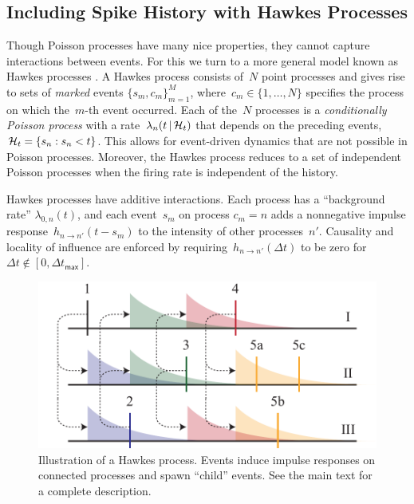 \subsection{Including Spike History with Hawkes Processes}
Though Poisson processes have many nice properties, they cannot
capture interactions between events. For this we turn to a more
general model known as Hawkes processes \cite{Hawkes-1971}. A Hawkes
process consists of~$N$ point processes and gives rise to sets of
\emph{marked} events $\{s_m,c_m\}_{m=1}^M$,
where~${c_m\in\{1,\ldots,N\}}$ specifies the process on which
the~$m$-th event occurred.  Each of the~$N$ processes is a
\emph{conditionally Poisson process} with a rate~${\lambda_n(t\,|\,
  \mathcal{H}_t)}$ that depends on the preceding
events,~$\mathcal{H}_t=\{s_n:s_n<t\}$.
This allows for event-driven dynamics that are not possible in Poisson
processes.  Moreover, the Hawkes process reduces to a set of
independent Poisson processes when the firing rate is independent of
the history.

Hawkes processes have additive interactions. Each process has a
``background rate'' $\lambda_{0,n}(t)$, and each event~$s_m$ on
process ${c_m=n}$ adds a nonnegative impulse response~$h_{n \to
  n'}(t-s_m)$ to the intensity of other processes~$n'$. Causality and
locality of influence are enforced by requiring~$h_{n \to n'}(\Delta
t)$ to be zero for~${\Delta t \notin[0,\Delta t_{\mathsf{max}}]}$.

\begin{figure}[t]
\centering%
\includegraphics[width=\linewidth]{figures/ch2/Hawkes-wide} 
\vspace{-0.25cm}
\caption[Illustration of a Hawkes process]{Illustration of a Hawkes
  process. Events induce impulse responses on connected processes and
  spawn ``child'' events. See the main text for a complete
  description.}
\label{fig:hawkes}
\end{figure}

